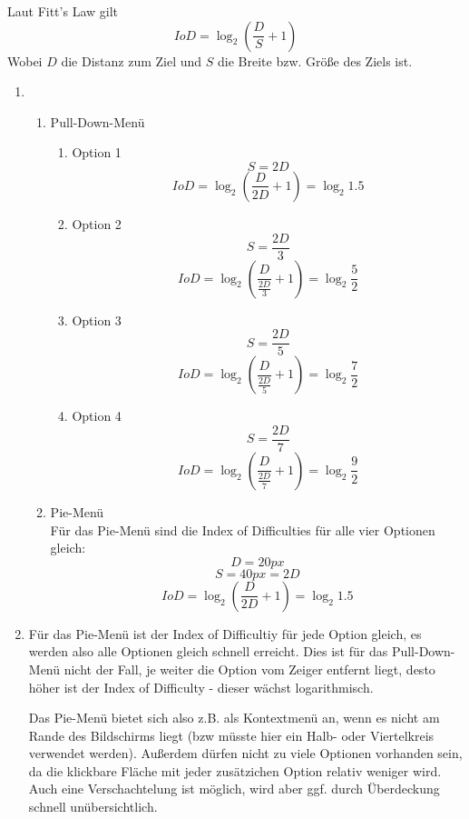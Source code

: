 \documentclass[a4paper,10pt]{article}
\begin{document}
\kopf
\renewcommand{\figurename}{Figure}

Laut Fitt's Law gilt
\[
	IoD = \log_2{\left(\frac{D}{S} + 1 \right)}
\]
Wobei $D$ die Distanz zum Ziel und $S$ die Breite bzw. Größe des Ziels ist.
\begin{enumerate}
	\item 
		\begin{enumerate}
			\item Pull-Down-Menü
			\begin{enumerate}
				\item Option 1
				 	\[ S = 2D \]
					\[ IoD = \log_2{\left(\frac{D}{2D} + 1 \right) = \log_2{1.5}}\]
				\item Option 2
				    \[ S = \frac{2D}{3} \]	
				    \[ IoD = \log_2{\left(\frac{D}{\frac{2D}{3}} + 1 \right)} = \log_2{\frac{5}{2}} \]
				\item Option 3
					\[ S = \frac{2D}{5} \]
					\[ IoD = \log_2{\left(\frac{D}{\frac{2D}{5}} + 1 \right)} = \log_2{\frac{7}{2}} \]
				\item Option 4
					\[ S = \frac{2D}{7} \]
					\[ IoD = \log_2{\left(\frac{D}{\frac{2D}{7}} + 1 \right)} = \log_2{\frac{9}{2}} \]
			\end{enumerate}
				
			\item Pie-Menü\\
				Für das Pie-Menü sind die Index of Difficulties für alle vier Optionen gleich:
				\[ D = 20px \]
				\[ S = 40px = 2D \]
				\[ IoD = \log_2{\left(\frac{D}{2D} + 1 \right) = \log_2{1.5}}\]
				
			
		\end{enumerate}
	\item
		Für das Pie-Menü ist der Index of Difficultiy für jede Option gleich, es werden also alle Optionen gleich schnell erreicht.
		Dies ist für das Pull-Down-Menü nicht der Fall, je weiter die Option vom Zeiger entfernt liegt, desto höher ist der Index of Difficulty - dieser wächst logarithmisch. 
		
		Das Pie-Menü bietet sich also z.B. als Kontextmenü an, wenn es nicht am Rande des Bildschirms liegt (bzw müsste hier ein Halb- oder Viertelkreis verwendet werden).
		Außerdem dürfen nicht zu viele Optionen vorhanden sein, da die klickbare Fläche mit jeder zusätzichen Option relativ weniger wird.
		Auch eine Verschachtelung ist möglich, wird aber ggf. durch Überdeckung schnell unübersichtlich.
\end{enumerate}
\end{document}
